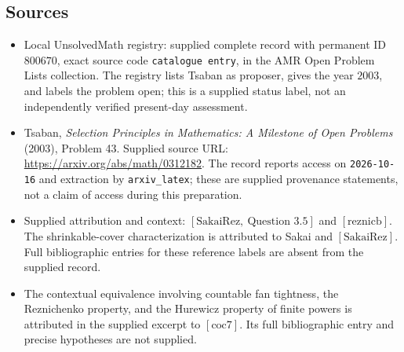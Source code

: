 \documentclass[11pt]{article}
\begin{document}
\subsection{Sources}
\begin{itemize}
\item Local UnsolvedMath registry: supplied complete record with permanent ID \(800670\), exact source code \texttt{catalogue entry}, in the AMR Open Problem Lists collection. The registry lists Tsaban as proposer, gives the year \(2003\), and labels the problem open; this is a supplied status label, not an independently verified present-day assessment.
\item Tsaban, \emph{Selection Principles in Mathematics: A Milestone of Open Problems} (2003), Problem 43. Supplied source URL: \url{https://arxiv.org/abs/math/0312182}. The record reports access on \texttt{2026-10-16} and extraction by \texttt{arxiv\_latex}; these are supplied provenance statements, not a claim of access during this preparation.
\item Supplied attribution and context: \([\mathrm{SakaiRez},\ \text{Question }3.5]\) and \([\mathrm{reznicb}]\). The shrinkable-cover characterization is attributed to Sakai and \([\mathrm{SakaiRez}]\). Full bibliographic entries for these reference labels are absent from the supplied record.
\item The contextual equivalence involving countable fan tightness, the Reznichenko property, and the Hurewicz property of finite powers is attributed in the supplied excerpt to \([\mathrm{coc7}]\). Its full bibliographic entry and precise hypotheses are not supplied.
\end{itemize}
\end{document}
